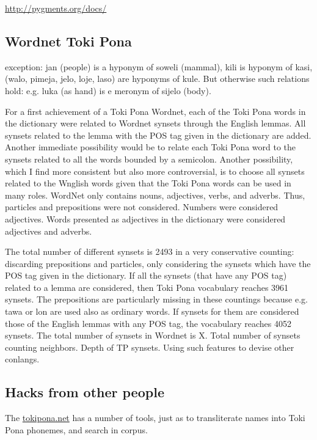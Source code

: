 \documentclass{article}
\begin{document}
\url{http://pygments.org/docs/}

\subsection{Wordnet Toki Pona}\label{wn}
exception: jan (people)
is a hyponym of soweli (mammal),
kili is hyponym of kasi,
(walo, pimeja, jelo, loje, laso) are hyponyms of kule.
But otherwise such relations hold:
e.g. luka (as hand) is e meronym of sijelo (body).

For a first achievement of a Toki Pona Wordnet,
each of the Toki Pona words in the dictionary
were related to Wordnet synsets
through the English lemmas.
All synsets related to the lemma with the POS tag
given in the dictionary are added.
Another immediate possibility would be to
relate each Toki Pona word to the synsets
related to all the words bounded by a semicolon.
Another possibility, which I find more consistent
but also more controversial,
is to choose all synsets related to the Wnglish
words given that the Toki Pona words can be used
in many roles.
WordNet only contains nouns, adjectives, verbs, and adverbs.
Thus, particles and prepositions were not considered.
Numbers were considered adjectives.
Words presented as adjectives in the dictionary
were considered adjectives and adverbs.

The total number of different synsets is 2493 in a very conservative
counting: discarding prepositions and particles,
only considering the synsets which have the POS tag
given in the dictionary.
If all the synsets (that have any POS tag)
related to a lemma are considered, 
then Toki Pona vocabulary reaches 3961 synsets.
The prepositions are particularly missing in these
countings because e.g. tawa or lon are used also
as ordinary words.
If synsets for them are considered those of the English
lemmas with any POS tag, the vocabulary reaches 4052
synsets.
The total number of synsets in Wordnet is X.
Total number of synsets counting neighbors.
Depth of TP synsets.
Using such features to devise other conlangs.


\subsection{Hacks from other people}
The \url{tokipona.net} has a number of tools,
just as to transliterate names into Toki Pona phonemes,
and search in corpus.
\end{document}
